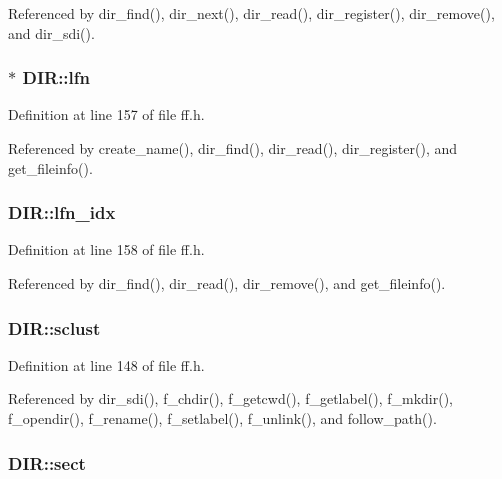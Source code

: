 Referenced by dir\-\_\-find(), dir\-\_\-next(), dir\-\_\-read(), dir\-\_\-register(), dir\-\_\-remove(), and dir\-\_\-sdi().

\hypertarget{structDIR_af62fd789383e6f1397f74617e11c135d}{
\subsubsection[{lfn}]{$\ast$ D\-I\-R\-::lfn}}\label{structDIR_af62fd789383e6f1397f74617e11c135d}


Definition at line 157 of file ff.\-h.



Referenced by create\-\_\-name(), dir\-\_\-find(), dir\-\_\-read(), dir\-\_\-register(), and get\-\_\-fileinfo().

\hypertarget{structDIR_acad41b18758c9278c14d47076e8149fc}{
\subsubsection[{lfn\-\_\-idx}]{ D\-I\-R\-::lfn\-\_\-idx}}\label{structDIR_acad41b18758c9278c14d47076e8149fc}


Definition at line 158 of file ff.\-h.



Referenced by dir\-\_\-find(), dir\-\_\-read(), dir\-\_\-remove(), and get\-\_\-fileinfo().

\hypertarget{structDIR_a9212af5877b94d790dd3bab3aa320994}{
\subsubsection[{sclust}]{ D\-I\-R\-::sclust}}\label{structDIR_a9212af5877b94d790dd3bab3aa320994}


Definition at line 148 of file ff.\-h.



Referenced by dir\-\_\-sdi(), f\-\_\-chdir(), f\-\_\-getcwd(), f\-\_\-getlabel(), f\-\_\-mkdir(), f\-\_\-opendir(), f\-\_\-rename(), f\-\_\-setlabel(), f\-\_\-unlink(), and follow\-\_\-path().

\hypertarget{structDIR_ad01fcc812ed0dad11a593574336adc9e}{
\subsubsection[{sect}]{ D\-I\-R\-::sect}}\label{structDIR_ad01fcc812ed0dad11a593574336adc9e}


